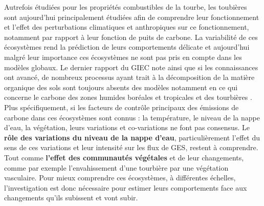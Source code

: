 Autrefois étudiées pour les propriétés combustibles de la tourbe, les toubières sont aujourd'hui principalement étudiées afin de comprendre leur fonctionnement et l'effet des perturbations climatiques et anthropiques sur ce fonctionnement, notamment par rapport à leur fonction de puits de carbone.
La variabilité de ces écosystèmes rend la prédiction de leurs comportements délicate et aujourd'hui malgré leur importance ces écosystèmes ne sont pas pris en compte dans les modèles globaux.
Le dernier rapport du GIEC note ainsi que si les connaissances ont avancé, de nombreux processus ayant trait à la décomposition de la matière organique des sols sont toujours absents des modèles notamment en ce qui concerne le carbone des zones humides boréales et tropicales et des tourbières \citep{Ciais2014}.
Plus spécifiquement, si les facteurs de contrôle principaux des émissions de carbone dans ces écosystèmes sont connus : la température, le niveau de la nappe d'eau, la végétation, leurs variations et co-variations ne font pas consensus. 
Le \textbf{rôle des variations du niveau de la nappe d'eau}, particulièrement l'effet du sens de ces variations et leur intensité sur les flux de GES, restent à comprendre.
Tout comme\textbf{ l'effet des communautés végétales} et de leur changements, comme par exemple l'envahissement d'une tourbière par une végétation vasculaire.
Pour mieux comprendre ces écosystèmes, à différentes échelles, l'investigation est donc nécessaire pour estimer leurs comportements face aux changements qu'ils subissent et vont subir.



